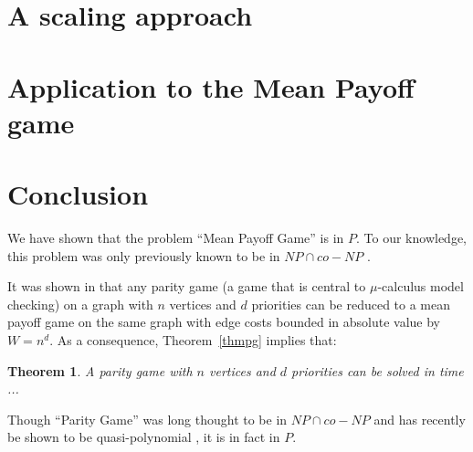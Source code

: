 \documentclass{article}
\newtheorem{theorem}{Theorem}
\begin{document}
\section{A scaling approach}
\label{scaling}

\section{Application to the Mean Payoff game}
\label{mpg}

\section{Conclusion}

We have shown that the problem ``Mean Payoff Game'' is in $P$. To our knowledge, this problem was only previously known to be in $NP \cap co-NP$ \cite{zwick}.

It was shown in \cite{puri} that any parity game (a game that is central to $\mu$-calculus model checking) on a graph with $n$ vertices and $d$ priorities can be reduced to a mean payoff game on the same graph with edge costs bounded in absolute value by $W=n^d$. As a consequence, Theorem~\ref{thmpg} implies that:
\begin{theorem}
A parity game with $n$ vertices and $d$ priorities can be solved in time ...
\end{theorem}
Though ``Parity Game'' was long thought to be in $NP \cap co-NP$ and has recently be shown to be quasi-polynomial \cite{calude}, it is in fact in $P$.





 
\end{document}
